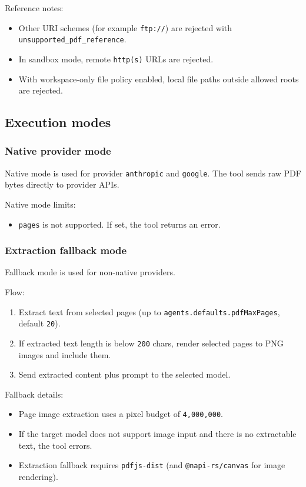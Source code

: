Reference notes:

\begin{itemize}
  \item Other URI schemes (for example \texttt{ftp://}) are rejected with \texttt{unsupported\_pdf\_reference}.
  \item In sandbox mode, remote \texttt{http(s)} URLs are rejected.
  \item With workspace-only file policy enabled, local file paths outside allowed roots are rejected.
\end{itemize}


\subsection{Execution modes}


\subsubsection{Native provider mode}


Native mode is used for provider \texttt{anthropic} and \texttt{google}.
The tool sends raw PDF bytes directly to provider APIs.

Native mode limits:

\begin{itemize}
  \item \texttt{pages} is not supported. If set, the tool returns an error.
\end{itemize}


\subsubsection{Extraction fallback mode}


Fallback mode is used for non-native providers.

Flow:

\begin{enumerate}
  \item Extract text from selected pages (up to \texttt{agents.defaults.pdfMaxPages}, default \texttt{20}).
  \item If extracted text length is below \texttt{200} chars, render selected pages to PNG images and include them.
  \item Send extracted content plus prompt to the selected model.
\end{enumerate}


Fallback details:

\begin{itemize}
  \item Page image extraction uses a pixel budget of \texttt{4,000,000}.
  \item If the target model does not support image input and there is no extractable text, the tool errors.
  \item Extraction fallback requires \texttt{pdfjs-dist} (and \texttt{@napi-rs/canvas} for image rendering).
\end{itemize}



